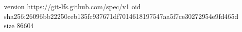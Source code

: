 version https://git-lfs.github.com/spec/v1
oid sha256:26096bb22250ceb135fc937671df7014618197547aa5f7ce30272954e9fd465d
size 86604
